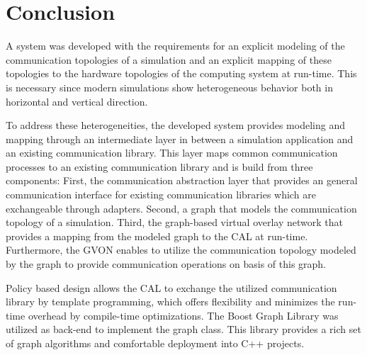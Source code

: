 \chapter{Conclusion}
\label{sec:conclusion}




A system was developed with the requirements for an explicit modeling
of the communication topologies of a simulation and an explicit
mapping of these topologies to the hardware topologies of the
computing system at run-time. This is necessary since modern
simulations show heterogeneous behavior both in horizontal and
vertical direction.

To address these heterogeneities, the developed system provides
modeling and mapping through an intermediate layer in between a
simulation application and an existing communication library.  This
layer maps common communication processes to an existing communication
library and is build from three components: First, the communication
abstraction layer that provides an general communication interface for
existing communication libraries which are exchangeable through
adapters.  Second, a graph that models the communication topology of a
simulation.  Third, the graph-based virtual overlay network that
provides a mapping from the modeled graph to the CAL at run-time.
Furthermore, the GVON enables to utilize the communication topology
modeled by the graph to provide communication operations on basis of
this graph.

Policy based design allows the CAL to exchange the utilized
communication library by template programming, which offers
flexibility and minimizes the run-time overhead by compile-time
optimizations.  The Boost Graph Library was utilized as back-end to
implement the graph class. This library provides a rich set of graph
algorithms and comfortable deployment into C++ projects.


